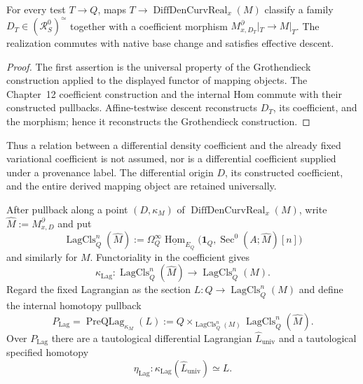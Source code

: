 \begin{proposition}
\label{prop:prequantum-differential-density-curvature-universal-property}
For every test $T\to Q$, maps
$T\to\operatorname{DiffDenCurvReal}_x(M)$ classify a family
$D_T\in(\mathcal R_S^0)^\simeq$ together with a coefficient morphism
$M^\partial_{x,D_T}|_T\to M|_T$.  The realization commutes with native base
change and satisfies effective descent.
\end{proposition}

\begin{proof}
The first assertion is the universal property of the Grothendieck construction
applied to the displayed functor of mapping objects.  The Chapter~12 coefficient
construction and the internal Hom commute with their constructed pullbacks.
Affine-testwise descent reconstructs $D_T$, its coefficient, and the morphism;
hence it reconstructs the Grothendieck construction.
\end{proof}

Thus a relation between a differential density coefficient and the already fixed
variational coefficient is not assumed, nor is a differential coefficient
supplied under a provenance label.  The differential origin $D$, its constructed
coefficient, and the entire derived mapping object are retained universally.

\begin{definition}
\label{constr:prequantum-differential-lagrangian-refinement}
After pullback along a point
$(D,\kappa_M)$ of $\operatorname{DiffDenCurvReal}_x(M)$, write
$\widehat M:=M^\partial_{x,D}$ and put
\[
\operatorname{LagCls}_Q^n(\widehat M)
:=
\Omega_Q^\infty
\underline{\operatorname{Hom}}_{E_Q}
\bigl(\mathbf1_Q,\operatorname{Sec}^0(A;\widehat M)[n]\bigr)
\]
and similarly for $M$.  Functoriality in the coefficient gives
\[
\kappa_{\mathrm{Lag}}:
\operatorname{LagCls}_Q^n(\widehat M)
\longrightarrow
\operatorname{LagCls}_Q^n(M).
\]
Regard the fixed Lagrangian as the section
$L:Q\to\operatorname{LagCls}_Q^n(M)$ and define the internal homotopy pullback
\[
\boxed{
P_{\mathrm{Lag}}
=
\operatorname{PreQLag}_{\kappa_M}(L)
:=
Q\times_{\operatorname{LagCls}_Q^n(M)}
\operatorname{LagCls}_Q^n(\widehat M).
}
\]
Over $P_{\mathrm{Lag}}$ there are a tautological differential Lagrangian
$\widehat L_{\mathrm{univ}}$ and a tautological specified homotopy
\[
\eta_{\mathrm{Lag}}:
\kappa_{\mathrm{Lag}}(\widehat L_{\mathrm{univ}})
\simeq
L.
\]
\end{definition}

